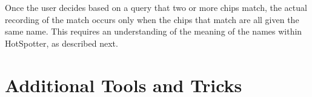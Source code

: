\documentclass[a4paper,10pt]{article}
\begin{document}
\noindent
  Once the user decides based on a query that two or more chips match,
  the actual recording of the match occurs only when the chips that
  match are all given the same name.  This requires an understanding
  of the meaning of the names within HotSpotter, as described next.

        \;

%
%
%

\section{Additional Tools and Tricks}
\end{document}
